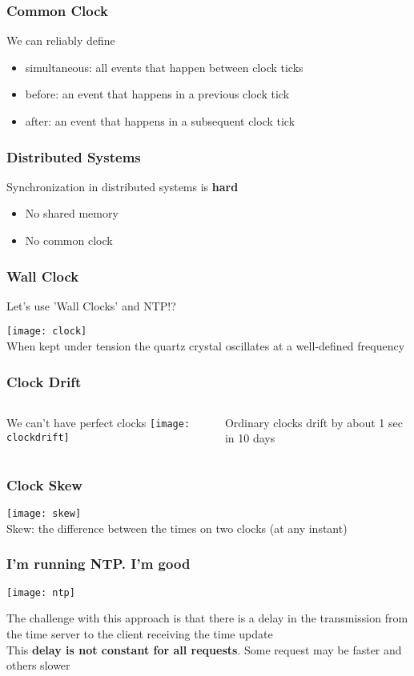 \documentclass[aspectratio=169, 15pt,usenames,dvipsnames]{beamer}
\begin{document}
	\begin{gdblank}
		\frametitle{Common Clock}
		\LARGE
		We can reliably define
		\begin{itemize}
			\item simultaneous: all events that happen between clock ticks
			\pause
			\item before: an event that happens in a previous clock tick
			\item after: an event that happens in a subsequent clock tick
		\end{itemize}
	\end{gdblank}
	\begin{gdblank}
		\frametitle{Distributed Systems}
		\LARGE
		Synchronization in distributed systems is \bf hard
		\begin{itemize}
			\item No shared memory
			\item No common clock
		\end{itemize}
	\end{gdblank}
	\begin{gdblank}
		\frametitle{Wall Clock}		
		\centering
		\LARGE	
		Let's use 'Wall Clocks' and NTP!?
		\par
		\texttt{[image: clock]}
		\small
		\\When kept under tension the quartz crystal oscillates at a well-defined frequency
	\end{gdblank}
	\begin{gdblank}
		\frametitle{Clock Drift}
		\begin{columns}
			\begin{column}{0.6\textwidth}
				We can't have perfect clocks
				\texttt{[image: clockdrift]}
			\end{column}
			\begin{column}{0.4\textwidth}
				Ordinary clocks drift by about 1 sec in 10 days
			\end{column}
		\end{columns}
	\end{gdblank}
	\begin{gdblank}
		\frametitle{Clock Skew}
		\centering
		\texttt{[image: skew]}
		\\Skew: the difference between the times on two clocks (at any instant)
	\end{gdblank}
	\begin{gdblank}
		\frametitle{I'm running NTP. I'm good}
		\centering\texttt{[image: ntp]}
		\par
		The challenge with this approach is that there is a delay in the transmission from the time server to the client receiving the time update
		\\This \textbf{delay is not constant for all requests}. Some request may be faster and others slower
	\end{gdblank}
\end{document}

